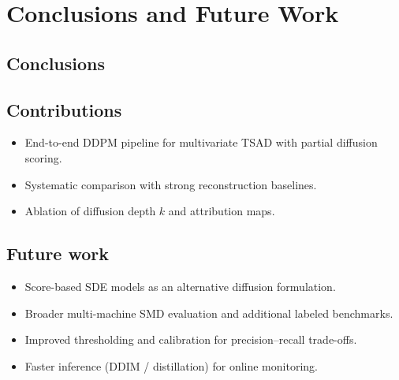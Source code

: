 \chapter{Conclusions and Future Work}
\label{ch:conclusion}

\section{Conclusions}

\section{Contributions}
\begin{itemize}
  \item End-to-end DDPM pipeline for multivariate TSAD with partial diffusion scoring.
  \item Systematic comparison with strong reconstruction baselines.
  \item Ablation of diffusion depth $k$ and attribution maps.
\end{itemize}

\section{Future work}
\begin{itemize}
  \item Score-based SDE models as an alternative diffusion formulation.
  \item Broader multi-machine SMD evaluation and additional labeled benchmarks.
  \item Improved thresholding and calibration for precision--recall trade-offs.
  \item Faster inference (DDIM / distillation) for online monitoring.
\end{itemize}
